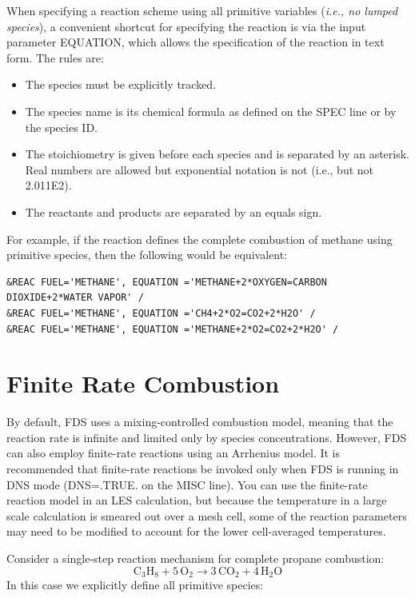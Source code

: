\documentclass[11pt]{book}
\begin{document}
When specifying a reaction scheme using all primitive variables ({\em i.e., no lumped species}), a convenient shortcut for specifying the reaction is via the input parameter {\ct EQUATION}, which allows the specification of the reaction in text form.  The rules are:

\begin{itemize}
\item The species must be explicitly tracked.
\item The species name is its chemical formula as defined on the {\ct SPEC} line or by the species {\ct ID}.
\item The stoichiometry is given before each species and is separated by an asterisk. Real numbers are allowed but exponential notation is not (i.e., {} but not {\ct 2.011E2}).
\item The reactants and products are separated by an equals sign.
\end{itemize}

\noindent For example, if the reaction defines the complete combustion of methane using primitive species, then the following would be equivalent:

\begin{lstlisting}
&REAC FUEL='METHANE', EQUATION ='METHANE+2*OXYGEN=CARBON DIOXIDE+2*WATER VAPOR' /
&REAC FUEL='METHANE', EQUATION ='CH4+2*O2=CO2+2*H2O' /
&REAC FUEL='METHANE', EQUATION ='METHANE+2*O2=CO2+2*H2O' /
\end{lstlisting}





\section{Finite Rate Combustion}
\label{info:finite}

By default, FDS uses a mixing-controlled combustion model, meaning that the reaction rate is infinite and limited only by species concentrations. However, FDS can also employ finite-rate reactions using an Arrhenius model. It is recommended that finite-rate reactions be invoked only
when FDS is running in DNS mode ({\ct DNS=.TRUE.} on the {\ct MISC} line).
You can use the finite-rate reaction model in an
LES calculation, but because the temperature in a large scale calculation
is smeared out over a mesh cell, some of the reaction parameters may need
to be modified to account for the lower cell-averaged temperatures.

Consider a single-step reaction mechanism for complete propane combustion:
\begin{equation}\label{eq:propane_1step}
\mathrm{C_3H_8 + 5\,O_{2} \rightarrow 3\,CO_{2} + 4\,H_{2}O}
\end{equation}
In this case we explicitly define all primitive species:
\end{document}
